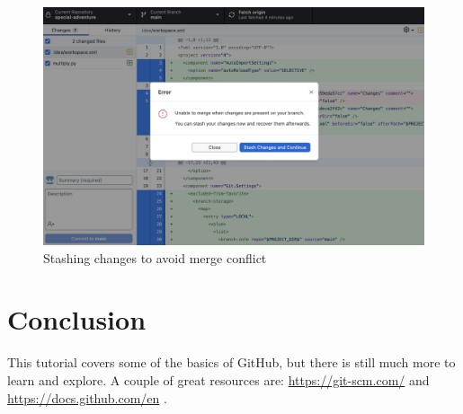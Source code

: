 \documentclass[10pt,twocolumn]{article}
\begin{document}
\begin{figure}
    \centering
    \includegraphics[width=.95\linewidth]{stashing.png}
    \caption{
        Stashing changes to avoid merge conflict
    }
    \label{fig:first-page}
\end{figure}


\section{Conclusion}

This tutorial covers some of the basics of GitHub, but there is still much more to learn and explore. A couple of great resources are: \url{https://git-scm.com/} \cite{GitHubDocs} and \url{https://docs.github.com/en} \cite{git}.

\printbibliography
\end{document}
